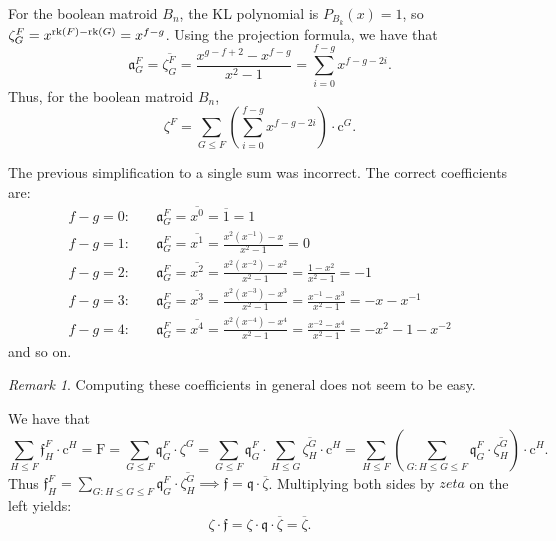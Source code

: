 \documentclass[11pt]{article}
\newcommand{\rank}{\normalfont\text{rk}}
\newcommand{\Ebasis}[1]{\mathrm{#1}}
\newcommand{\Cbasis}[1]{\mathrm{c}^{#1}}
\newcommand{\Zbasis}[1]{\zeta^{#1}}
\newcommand{\ZbasisSub}[2]{\zeta^{#1}_{#2}}
\newcommand{\klchowcoeff}{\mathfrak{a}}
\theoremstyle{remark}
\newtheorem*{remark}{Remark} %
\begin{document}
\begin{tcolorbox}[colback=red!10!white, colframe=red!50!black, title=Example---Incorrect Simplification]
    For the boolean matroid \(B_n\), the KL polynomial is \(P_{B_k}(x)=1\),
    so \(\ZbasisSub{F}{G} = x^{\rank(F)-\rank(G)} = x^{f-g}\).
    Using the projection formula, we have that
    \[\klchowcoeff^F_{G} = \overline{\ZbasisSub{F}{G}} = \frac{x^{g-f+2} - x^{f-g}}{x^2 - 1} =
        \sum_{i=0}^{f-g} x^{f-g-2i}. \tag{the product telescopes}\]
    Thus, for the boolean matroid \(B_n\),
    \[ \Zbasis{F} = \sum_{G \le F} \left( \sum_{i=0}^{f-g} x^{f-g-2i} \right) \cdot \Cbasis{G}. \]

    The previous simplification to a single sum was incorrect. The correct coefficients are:
    \begin{align*}
        f-g=0: & \quad \klchowcoeff^F_{G} = \overline{x^0} = \overline{1} = 1                                                           \\
        f-g=1: & \quad \klchowcoeff^F_{G} = \overline{x^1} = \frac{x^2(x^{-1}) - x}{x^2-1} = 0                                          \\
        f-g=2: & \quad \klchowcoeff^F_{G} = \overline{x^2} = \frac{x^2(x^{-2}) - x^2}{x^2-1} = \frac{1-x^2}{x^2-1} = -1                 \\
        f-g=3: & \quad \klchowcoeff^F_{G} = \overline{x^3} = \frac{x^2(x^{-3}) - x^3}{x^2-1} = \frac{x^{-1}-x^3}{x^2-1} = -x-x^{-1}     \\
        f-g=4: & \quad \klchowcoeff^F_{G} = \overline{x^4} = \frac{x^2(x^{-4}) - x^4}{x^2-1} = \frac{x^{-2}-x^4}{x^2-1} = -x^2-1-x^{-2}
    \end{align*}
    and so on.
\end{tcolorbox}
\begin{remark}
    Computing these coefficients in general does not seem to be easy.
\end{remark}
We have that
\[ \sum_{H \le F} \mathfrak{f}^F_H \cdot \Cbasis{H} =
    \Ebasis{F} = \sum_{G \le F} \mathfrak{q}^F_G \cdot \Zbasis{G}
    = \sum_{G \le F} \mathfrak{q}^F_G \cdot \sum_{H \le G} \overline{\ZbasisSub{G}{H}} \cdot \Cbasis{H}
    = \sum_{H \le F} \left( \sum_{G: H \le G \le F} \mathfrak{q}^F_G \cdot \overline{\ZbasisSub{G}{H}} \right) \cdot \Cbasis{H}. \]
Thus \(\mathfrak{f}^F_H = \sum_{G: H \le G \le F} \mathfrak{q}^F_G \cdot \overline{\ZbasisSub{G}{H}}
\implies \mathfrak{f} = \mathfrak{q} \cdot \overline{\zeta}\).
Multiplying both sides by \(zeta\) on the left yields:
\[ \zeta \cdot \mathfrak{f} = \zeta \cdot \mathfrak{q} \cdot \overline{\zeta} = \overline{\zeta}. \]
\end{document}
